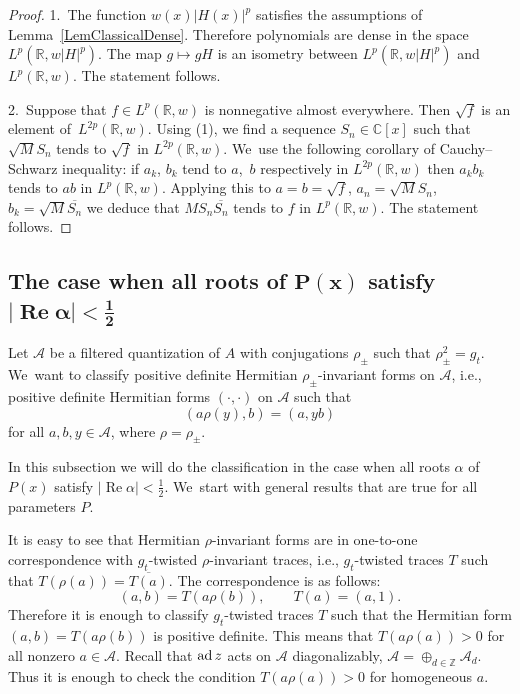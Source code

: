 \documentclass[10pt,a4paper]{amsart}
\newcommand{\RN}{\mathbb{R}} %
\newcommand{\CN}{\mathbb{C}} %
\newcommand{\ZN}{\mathbb{Z}} %
\newcommand{\ovl}{\overline}
\newcommand{\ad}{\ensuremath\operatorname{ad}}
\newcommand{\mc}[1]{\mathcal{#1}}
\renewcommand{\Re}{\operatorname{Re}}
\theoremstyle{definition}
\numberwithin{equation}{section}
\begin{document}
\begin{proof}
1.\ The function $w(x)|H(x)|^p$ satisfies the assumptions of Lemma~\ref{LemClassicalDense}. Therefore polynomials are dense in the space $L^p(\RN,w|H|^p)$. The map $g\mapsto gH$ is an isometry between $L^p(\RN,w|H|^p)$ and $L^p(\RN,w)$. The statement follows.

2.\ Suppose that $f\in L^p(\RN,w)$ is nonnegative almost everywhere. Then $\sqrt{f}$ is an element of~$L^{2p}(\RN,w)$. Using (1), we find a sequence $S_n\in \CN[x]$ such that $\sqrt{M}S_n$ tends to $\sqrt{f}$ in $L^{2p}(\RN,w)$. We~use the following corollary of Cauchy--Schwarz inequality: if $a_k$, $b_k$ tend to $a$,~$b$ respectively in $L^{2p}(\RN,w)$ then $a_kb_k$ tends to $ab$ in $L^p(\RN,w)$.
Applying this to $a=b=\sqrt{f}$, $a_n=\sqrt{M}S_n$, $b_k=\sqrt{M}\ovl{S_n}$ we deduce that $MS_n\ovl{S_n}$ tends to $f$ in $L^p(\RN,w)$. The statement follows.
\end{proof}

\subsection[The case when all roots of P(x) satisfy |Re alpha|<1/2]
{The case when all roots of $\boldsymbol{P(x)}$ satisfy $\boldsymbol{|\Re\alpha|<\frac{1}{2}}$}

Let $\mc A$ be a filtered quantization of $A$ with conjugations $\rho_\pm$ such that $\rho_\pm^2=g_t$. We~want to classify positive definite Hermitian $\rho_\pm$-invariant forms on $\mc{A}$, i.e., positive definite Hermitian forms $(\cdot,\cdot)$ on $\mc{A}$ such that
\[
(a\rho(y),b)=(a,yb)
\]
 for all $a,b,y\in\mc{A}$, where $\rho=\rho_\pm$.

In this subsection we will do the classification in the case when all roots $\alpha$ of $P(x)$ satisfy $|\Re\alpha|<\tfrac{1}{2}$. We~start with general results that are true for all parameters $P$.

 It is easy to see that Hermitian $\rho$-invariant forms are in one-to-one correspondence with $g_t$-twisted $\rho$-invariant traces, i.e., $g_t$-twisted traces $T$ such that $T(\rho(a))=\overline{T(a)}$. The correspondence is as follows:
 \[(a,b)=T(a\rho(b)),\qquad T(a)=(a,1).\] Therefore it is enough to classify $g_t$-twisted traces $T$ such that the Hermitian form $(a,b)=T(a\rho(b))$ is positive definite. This means that $T(a\rho(a))>0$ for all nonzero $a\in \mc{A}$. Recall that $\ad z$ acts on $\mc{A}$ diagonalizably, $\mc{A}=\oplus_{d\in \ZN} \mc{A}_{d}$. Thus it is enough to check the condition $T(a\rho(a))>0$ for homogeneous $a$.
\end{document}
